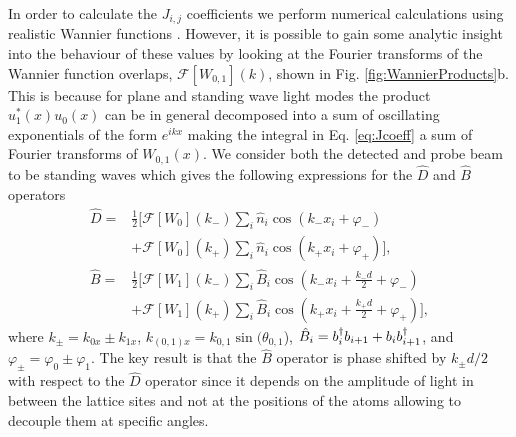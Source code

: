 In order to calculate the $J_{i,j}$ coefficients we perform numerical
calculations using realistic Wannier functions
\cite{walters2013}. However, it is possible to gain some analytic
insight into the behaviour of these values by looking at the Fourier
transforms of the Wannier function overlaps,
$\mathcal{F}[W_{0,1}](k)$, shown in Fig.
\ref{fig:WannierProducts}b. This is because for plane and standing
wave light modes the product $u_1^*(x) u_0(x)$ can be in general
decomposed into a sum of oscillating exponentials of the form
$e^{i k x}$ making the integral in Eq. \eqref{eq:Jcoeff} a sum of
Fourier transforms of $W_{0,1}(x)$. We consider both the detected and
probe beam to be standing waves which gives the following expressions
for the $\hat{D}$ and $\hat{B}$ operators
\begin{align}
  \label{eq:FTs}
  \hat{D} = & \frac{1}{2}[\mathcal{F}[W_0](k_-)\sum_i\hat{n}_i\cos(k_-
              x_i +\varphi_-) \nonumber\\ 
            & + \mathcal{F}[W_0](k_+)\sum_i\hat{n}_i\cos(k_+ x_i +\varphi_+)],
              \nonumber\\ 
  \hat{B} = & \frac{1}{2}[\mathcal{F}[W_1](k_-)\sum_i\hat{B}_i\cos(k_- x_i
              +\frac{k_-d}{2}+\varphi_-) \nonumber\\ 
            & +\mathcal{F}[W_1](k_+)\sum_i\hat{B}_i\cos(k_+
              x_i +\frac{k_+d}{2}+\varphi_+)],
\end{align}
where $k_\pm = k_{0x} \pm k_{1x}$,
$k_{(0,1)x} = k_{0,1} \sin(\theta_{0,1}$),
$\hat{B}_i=b^\dagger_ib_{i+1}+b_ib^\dagger_{i+1}$, and
$\varphi_\pm=\varphi_0 \pm \varphi_1$. The key result is that the
$\hat{B}$ operator is phase shifted by $k_\pm d/2$ with respect to the
$\hat{D}$ operator since it depends on the amplitude of light in
between the lattice sites and not at the positions of the atoms
allowing to decouple them at specific angles.

